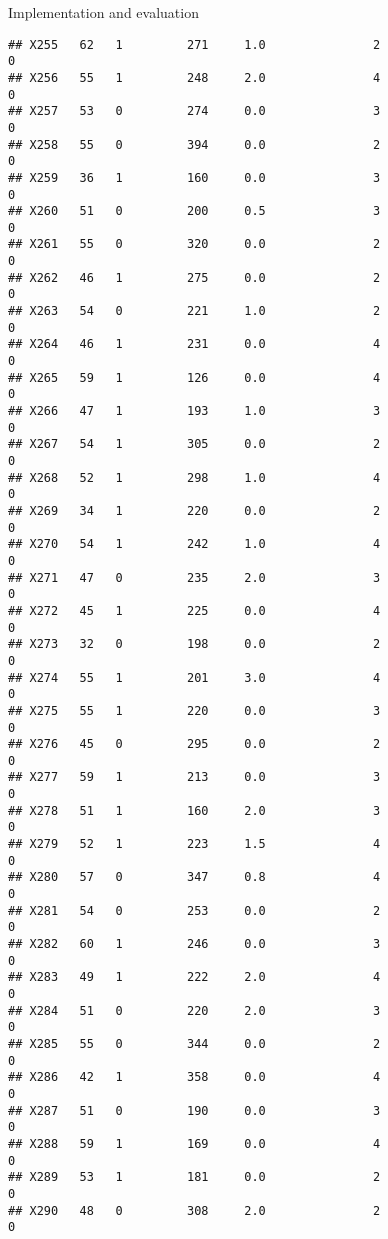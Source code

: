 \documentclass[
  ignorenonframetext,
]{beamer}
\begin{document}
\begin{frame}[fragile]{Implementation and evaluation}
\begin{verbatim}
## X255   62   1         271     1.0               2                   0
## X256   55   1         248     2.0               4                   0
## X257   53   0         274     0.0               3                   0
## X258   55   0         394     0.0               2                   0
## X259   36   1         160     0.0               3                   0
## X260   51   0         200     0.5               3                   0
## X261   55   0         320     0.0               2                   0
## X262   46   1         275     0.0               2                   0
## X263   54   0         221     1.0               2                   0
## X264   46   1         231     0.0               4                   0
## X265   59   1         126     0.0               4                   0
## X266   47   1         193     1.0               3                   0
## X267   54   1         305     0.0               2                   0
## X268   52   1         298     1.0               4                   0
## X269   34   1         220     0.0               2                   0
## X270   54   1         242     1.0               4                   0
## X271   47   0         235     2.0               3                   0
## X272   45   1         225     0.0               4                   0
## X273   32   0         198     0.0               2                   0
## X274   55   1         201     3.0               4                   0
## X275   55   1         220     0.0               3                   0
## X276   45   0         295     0.0               2                   0
## X277   59   1         213     0.0               3                   0
## X278   51   1         160     2.0               3                   0
## X279   52   1         223     1.5               4                   0
## X280   57   0         347     0.8               4                   0
## X281   54   0         253     0.0               2                   0
## X282   60   1         246     0.0               3                   0
## X283   49   1         222     2.0               4                   0
## X284   51   0         220     2.0               3                   0
## X285   55   0         344     0.0               2                   0
## X286   42   1         358     0.0               4                   0
## X287   51   0         190     0.0               3                   0
## X288   59   1         169     0.0               4                   0
## X289   53   1         181     0.0               2                   0
## X290   48   0         308     2.0               2                   0

\end{verbatim}
\end{frame}
\end{document}
